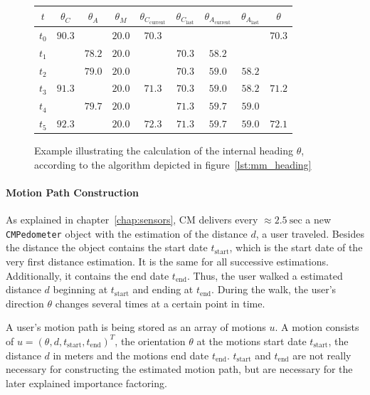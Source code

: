 \begin{figure}
\begin{tabular}{c|ccc|c|ccc||c}
\textbf{$t$} & \textbf{$\theta_C$} & \textbf{$\theta_A$} & \textbf{$\theta_M$} & $\theta_{C_\text{current}}$ & $\theta_{C_\text{last}}$ & $\theta_{A_\text{current}}$ & $\theta_{A_\text{last}}$ & \textbf{$\theta$}\\
\hline
$t_0$ & $90.3$ & & $20.0$ & $70.3$ & & & & $70.3$\\
$t_1$ & & $78.2$ & $20.0$ & & $70.3$ & $58.2$ & &\\
$t_2$ & & $79.0$ & $20.0$ & & $70.3$ & $59.0$ & $58.2$ &\\
$t_3$ & $91.3$ & & $20.0$ & $71.3$ & $70.3$ & $59.0$ & $58.2$ & $71.2$\\
$t_4$ & & $79.7$ & $20.0$ & & $71.3$ & $59.7$ & $59.0$ &\\
$t_5$ & $92.3$ & & $20.0$ & $72.3$ & $71.3$ & $59.7$ & $59.0$ & $72.1$\\

\end{tabular}
\caption{Example illustrating the calculation of the internal heading $\theta$, according to the algorithm depicted in figure~\ref{lst:mm_heading}}
\label{tab:mm_heading}
\end{figure}

\paragraph{Motion Path Construction}
As explained in chapter~\ref{chap:sensors}, \acs{CM} delivers every $\approx 2.5~\text{sec}$ a new \texttt{CMPedometer} object with the estimation of the distance $d$, a user traveled. Besides the distance the object contains the start date $t_\text{start}$, which is the start date of the very first distance estimation. It is the same for all successive estimations. Additionally, it contains the end date $t_\text{end}$. Thus, the user walked a estimated distance $d$ beginning at $t_\text{start}$ and ending at $t_\text{end}$. During the walk, the user's direction $\theta$ changes several times at a certain point in time.

A user's motion path is being stored as an array of motions $u$. A motion consists of $u = (\theta, d, t_\text{start}, t_\text{end})^T$, the orientation $\theta$ at the motions start date $t_\text{start}$, the distance $d$ in meters and the motions end date $t_\text{end}$. $t_\text{start}$ and $t_\text{end}$ are not really necessary for constructing the estimated motion path, but are necessary for the later explained importance factoring.

